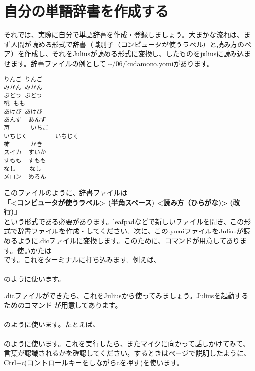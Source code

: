 \newpage
\section{自分の単語辞書を作成する}
それでは、実際に自分で単語辞書を作成・登録しましょう。大まかな流れは、まず人間が読める形式で辞書（識別子（コンピュータが使うラベル）と読み方のペア）を作成し、それをJuliusが読める形式に変換し、したものをjuliusに読み込ませます。辞書ファイルの例として \textasciitilde /06/kudamono.yomiがあります。\\

\begin{lstlisting}[caption=kudamino.yomi,label=kudamino.yomi]
りんご りんご
みかん みかん
ぶどう ぶどう
桃 もも
あけび あけび
あんず  あんず
苺      いちご
いちじく        いちじく
柿      かき
スイカ  すいか
すもも  すもも
なし    なし
メロン  めろん
\end{lstlisting}

このファイルのように、辞書ファイルは\\
\textbf{「<コンピュータが使うラベル> (半角スペース) <読み方（ひらがな)> (改行)」}\\
という形式である必要があります。leafpadなどで新しいファイルを開き、この形式で辞書ファイルを作成・してください。次に、この.yomiファイルをJuliusが読めるように.dicファイルに変換します。このために、コマンドが用意してあります。使いかたは\\
です。これをターミナルに打ち込みます。例えば、\\
\\
のように使います。

.dicファイルができたら、これをJuliusから使ってみましょう。Juliusを起動するためのコマンド  が用意してあります。\\
\\
のように使います。たとえば、\\
\\
のように使います。これを実行したら、またマイクに向かって話しかけてみて、言葉が認識されるかを確認してください。するときは\pageref{Julius}ページで説明したように、Ctrl+c(コントロールキーをしながらcを押す)を使います。

\begin{tcolorbox}[title=\useOmetoi]
\begin{enumerate}
\end{enumerate}
\end{tcolorbox}
